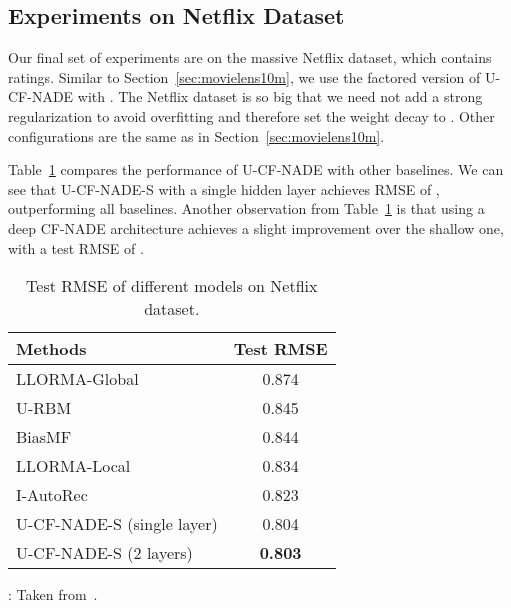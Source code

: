 \documentclass{article}
\newcommand{\cfnade}{CF-NADE\xspace}
\begin{document}
 \subsection{Experiments on Netflix Dataset}
 \label{sec:netflix}
 Our final set of experiments are on the massive Netflix dataset,
 which contains  ratings. Similar to
 Section~\ref{sec:movielens10m}, we use the factored version of
 U-\cfnade with . The Netflix dataset is so big that we need not
 add a strong regularization to avoid overfitting and therefore set
 the weight decay to . Other configurations are the same as in
 Section~\ref{sec:movielens10m}.
 
 Table~\ref{tab:netflix} compares the performance of U-\cfnade with
 other baselines. We can see that U-{\cfnade}-S with a single
 hidden layer achieves RMSE of , outperforming all
 baselines. Another observation from Table~\ref{tab:netflix} is that
 using a deep \cfnade architecture achieves a slight improvement over
 the shallow one, with a test RMSE of .
 
 \begin{table}[h]
 \caption{Test RMSE of different models on Netflix dataset.}
 \label{tab:netflix}
 \begin{center}
 \begin{small}
 \begin{sc}
 \begin{tabular}{lc}
 \hline
 \abovespace\belowspace
 Methods & Test RMSE  \\
 \hline
 \abovespace
 LLORMA-Global~\citep{lee2013local} & 0.874\\
 U-RBM & 0.845\\
 BiasMF & 0.844 \\
 LLORMA-Local~\citep{lee2013local} & 0.834\\
 \belowspace
 I-AutoRec~\citep{sedhain2015autorec} & 0.823\\
 U-{\cfnade}-S (single layer) & 0.804\\
 U-{\cfnade}-S (2 layers) & {\bf 0.803}\\
 \hline
 \end{tabular}
 \end{sc}
 \end{small}
 \begin{minipage}{0.48\textwidth}
{\small
: Taken from~\citep{sedhain2015autorec}.
}
\end{minipage}
 \end{center}
 \end{table}
 
\end{document}
